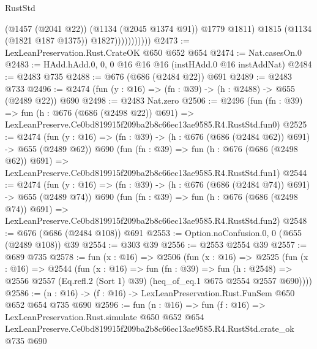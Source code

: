 \begin{lexlean}{RustStd}
\begin{coremodule}
                            (@1457 (@2041 @22))
                            (@1134 (@2045 @1374 @91))
                            @1779
                            @1811)
                          @1815
                          (@1134 (@1821 @187 @1375))
                          @1827)))))))))))
@2473 := LexLeanPreservation.Rust.CrateOK @650 @652 @654
@2474 := Nat.casesOn.{0}
@2483 := HAdd.hAdd.{0, 0, 0} @16 @16 @16 (instHAdd.{0} @16 instAddNat)
@2484 := @2483 @735
@2488 := @676 (@686 (@2484 @22)) @691
@2489 := @2483 @733
@2496 := @2474 (fun (y : @16) => (fn : @39) -> (h : @2488) -> @655 (@2489 @22)) @690
@2498 := @2483 Nat.zero
@2506 := @2496
    (fun (fn : @39) =>
    fun (h : @676 (@686 (@2498 @22)) @691) =>
    LexLeanPreserve.Ce0bd819915f209ba2b8c66ec13ae9585.R4.RustStd.fun0)
@2525 := @2474
    (fun (y : @16) => (fn : @39) -> (h : @676 (@686 (@2484 @62)) @691) -> @655 (@2489 @62))
    @690
    (fun (fn : @39) =>
    fun (h : @676 (@686 (@2498 @62)) @691) =>
    LexLeanPreserve.Ce0bd819915f209ba2b8c66ec13ae9585.R4.RustStd.fun1)
@2544 := @2474
    (fun (y : @16) => (fn : @39) -> (h : @676 (@686 (@2484 @74)) @691) -> @655 (@2489 @74))
    @690
    (fun (fn : @39) =>
    fun (h : @676 (@686 (@2498 @74)) @691) =>
    LexLeanPreserve.Ce0bd819915f209ba2b8c66ec13ae9585.R4.RustStd.fun2)
@2548 := @676 (@686 (@2484 @108)) @691
@2553 := Option.noConfusion.{0, 0} (@655 (@2489 @108)) @39
@2554 := @303 @39
@2556 := @2553 @2554 @39
@2557 := @689 @735
@2578 := fun (x : @16) =>
  @2506
    (fun (x : @16) =>
    @2525
      (fun (x : @16) =>
      @2544
        (fun (x : @16) =>
        fun (fn : @39) =>
        fun (h : @2548) =>
        @2556 @2557 (Eq.refl.{2} (Sort 1) @39) (heq_of_eq.{1} @675 @2554 @2557 @690))))
@2586 := (n : @16) -> (f : @16) -> LexLeanPreservation.Rust.FunSem @650 @652 @654 @735 @690
@2596 := fun (n : @16) =>
  fun (f : @16) =>
  LexLeanPreservation.Rust.simulate
    @650
    @652
    @654
    LexLeanPreserve.Ce0bd819915f209ba2b8c66ec13ae9585.R4.RustStd.crate_ok
    @735
    @690
\end{coremodule}
\end{lexlean}

